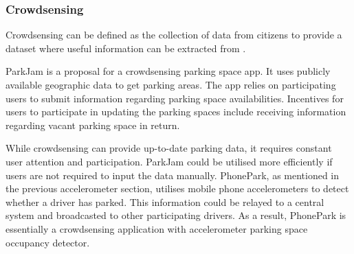 \subsubsection*{Crowdsensing}
Crowdsensing can be defined as the collection of data from citizens to provide a dataset where useful information can be extracted from \cite{Villanueva2016CrowdsensingMonitoring}. 

ParkJam \citep{Kopeck2012PARKJAM:Demo} is a proposal for a crowdsensing parking space app. It uses publicly available geographic data to get parking areas. The app relies on participating users to submit information regarding parking space availabilities. Incentives for users to participate in updating the parking spaces include receiving information regarding vacant parking space in return.

While crowdsensing can provide up-to-date parking data, it requires constant user attention and participation. ParkJam could be utilised more efficiently if users are not required to input the data manually. PhonePark\cite{xu_real-time_2013}, as mentioned in the previous accelerometer section, utilises mobile phone accelerometers to detect whether a driver has parked. This information could be relayed to a central system and broadcasted to other participating drivers. As a result, PhonePark is essentially a crowdsensing application with accelerometer parking space occupancy detector.